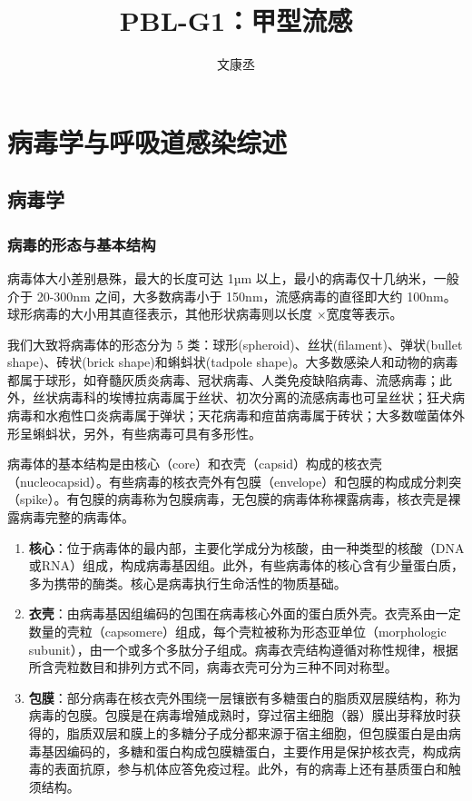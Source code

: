 \documentclass[9pt,a4paper,twoside]{rho-class/rho}
\title{PBL-G1：甲型流感}
\author[1]{文康丞}
\affil[1]{24级临床五班，北京大学医学部}
\begin{document}

    \maketitle
    \thispagestyle{firststyle}
    \tableofcontents
    \linenumbers

\section{病毒学与呼吸道感染综述}

    \subsection{病毒学}

    \subsubsection{病毒的形态与基本结构}

    病毒体大小差别悬殊，最大的长度可达 1µm 以上，最小的病毒仅十几纳米，一般介于 20-300nm 之间，大多数病毒小于 150nm，流感病毒的直径即大约 100nm。球形病毒的大小用其直径表示，其他形状病毒则以长度 ×宽度等表示。

    我们大致将病毒体的形态分为 5 类：球形(spheroid)、丝状(filament)、弹状(bullet shape)、砖状(brick shape)和蝌蚪状(tadpole shape)。大多数感染人和动物的病毒都属于球形，如脊髓灰质炎病毒、冠状病毒、人类免疫缺陷病毒、流感病毒；此外，丝状病毒科的埃博拉病毒属于丝状、初次分离的流感病毒也可呈丝状；狂犬病病毒和水疱性口炎病毒属于弹状；天花病毒和痘苗病毒属于砖状；大多数噬菌体外形呈蝌蚪状，另外，有些病毒可具有多形性。
    
    病毒体的基本结构是由核心（core）和衣壳（capsid）构成的核衣壳（nucleocapsid）。有些病毒的核衣壳外有包膜（envelope）和包膜的构成成分刺突（spike）。有包膜的病毒称为包膜病毒，无包膜的病毒体称裸露病毒，核衣壳是裸露病毒完整的病毒体。

\begin{enumerate}
    \item \textbf{核心}：位于病毒体的最内部，主要化学成分为核酸，由一种类型的核酸（DNA或RNA）组成，构成病毒基因组。此外，有些病毒体的核心含有少量蛋白质，多为携带的酶类。核心是病毒执行生命活性的物质基础。
    \item \textbf{衣壳}：由病毒基因组编码的包围在病毒核心外面的蛋白质外壳。衣壳系由一定数量的壳粒（capsomere）组成，每个壳粒被称为形态亚单位（morphologic subunit），由一个或多个多肽分子组成。病毒衣壳结构遵循对称性规律，根据所含壳粒数目和排列方式不同，病毒衣壳可分为三种不同对称型。
    \item \textbf{包膜}：部分病毒在核衣壳外围绕一层镶嵌有多糖蛋白的脂质双层膜结构，称为病毒的包膜。包膜是在病毒增殖成熟时，穿过宿主细胞（器）膜出芽释放时获得的，脂质双层和膜上的多糖分子成分都来源于宿主细胞，但包膜蛋白是由病毒基因编码的，多糖和蛋白构成包膜糖蛋白，主要作用是保护核衣壳，构成病毒的表面抗原，参与机体应答免疫过程。此外，有的病毒上还有基质蛋白和触须结构。
\end{enumerate}
\end{document}

